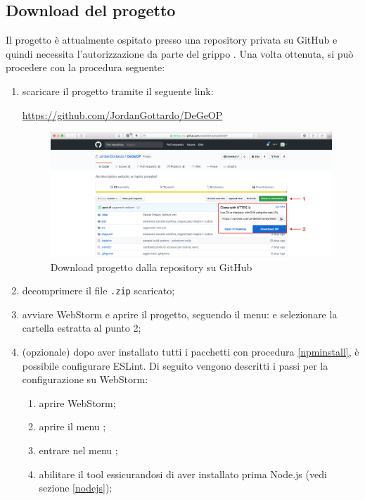 	\subsection{Download del progetto} \label{downloadProgetto}
	Il progetto è attualmente ospitato presso una repository privata su GitHub e quindi necessita l'autorizzazione da parte del grippo \zephyrus. Una volta ottenuta, si può procedere con la procedura seguente:
	\begin{enumerate}
		\item scaricare il progetto tramite il seguente link:
			\begin{center}
				\url{https://github.com/JordanGottardo/DeGeOP}
			\end{center}
			\begin{figure}[H]
				\centering 
				\includegraphics[width=1\columnwidth]{img/downloadProgetto.png}
				\caption{Download progetto \progetto dalla repository su GitHub}
			\end{figure}
		\item decomprimere il file \texttt{.zip} scaricato;
		\item avviare WebStorm e aprire il progetto, seguendo il menu:  e selezionare la cartella estratta al punto 2;
		\item (opzionale) dopo aver installato tutti i pacchetti con procedura \ref{npminstall}, è possibile configurare ESLint. Di seguito vengono descritti i passi per la configurazione su WebStorm:
			\begin{enumerate}
				\item aprire WebStorm;
				\item aprire il menu ;
				\item entrare nel menu ;
				\item abilitare il tool essicurandosi di aver installato prima Node.js (vedi sezione \ref{nodejs});

\end{enumerate}
\end{enumerate}
